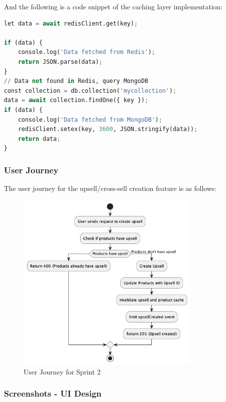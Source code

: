 \newpage

And the following is a code snippet of the caching layer implementation:

\begin{lstlisting}[language=Python, caption=Redis Caching Layer Implementation, label=lst:redis_caching_layer, frame=single, framerule=0.5pt]
let data = await redisClient.get(key);

if (data) {
    console.log('Data fetched from Redis');
    return JSON.parse(data);
}
// Data not found in Redis, query MongoDB
const collection = db.collection('mycollection');
data = await collection.findOne({ key });
if (data) {
    console.log('Data fetched from MongoDB');
    redisClient.setex(key, 3600, JSON.stringify(data));
    return data;
}
\end{lstlisting}

\subsubsection{User Journey}

The user journey for the upsell/cross-sell creation feature is as follows:

\begin{figure}[H]
    \centering
    \includegraphics[width=0.8\textwidth]{images/sprintTwoActivity.png}
    \caption{User Journey for Sprint 2}
    \label{fig:user_journey_sprint2}
\end{figure}

\subsubsection{Screenshots - UI Design}

